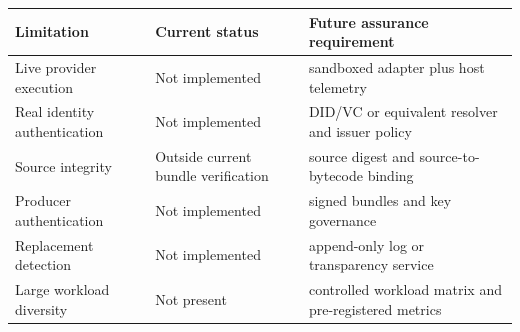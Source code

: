 \begin{tabularx}{\linewidth}{@{}XXX@{}}
\toprule
Limitation & Current status & Future assurance requirement \\
\midrule
Live provider execution & Not implemented & sandboxed adapter plus host telemetry \\
Real identity authentication & Not implemented & DID/VC or equivalent resolver and issuer policy \\
Source integrity & Outside current bundle verification & source digest and source-to-bytecode binding \\
Producer authentication & Not implemented & signed bundles and key governance \\
Replacement detection & Not implemented & append-only log or transparency service \\
Large workload diversity & Not present & controlled workload matrix and pre-registered metrics \\
\bottomrule
\end{tabularx}
